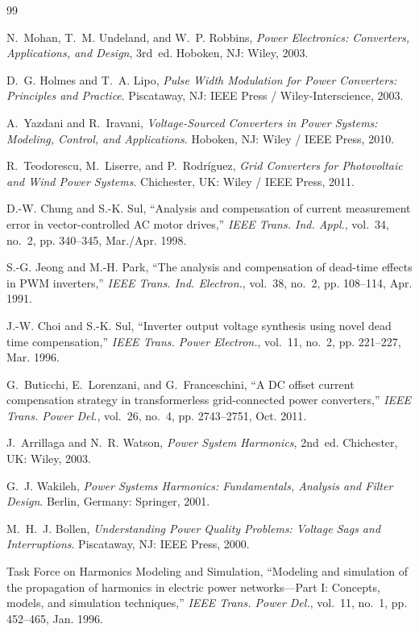 \documentclass[11pt,a4paper]{article}
\begin{document}
\begin{thebibliography}{99}

N.~Mohan, T.~M. Undeland, and W.~P. Robbins,
\emph{Power Electronics: Converters, Applications, and Design}, 3rd~ed.
Hoboken, NJ: Wiley, 2003.

D.~G. Holmes and T.~A. Lipo,
\emph{Pulse Width Modulation for Power Converters: Principles and Practice}.
Piscataway, NJ: IEEE Press / Wiley-Interscience, 2003.

A.~Yazdani and R.~Iravani,
\emph{Voltage-Sourced Converters in Power Systems: Modeling, Control, and
Applications}. Hoboken, NJ: Wiley / IEEE Press, 2010.

R.~Teodorescu, M.~Liserre, and P.~Rodr\'iguez,
\emph{Grid Converters for Photovoltaic and Wind Power Systems}.
Chichester, UK: Wiley / IEEE Press, 2011.

D.-W. Chung and S.-K. Sul,
``Analysis and compensation of current measurement error in vector-controlled
AC motor drives,'' \emph{IEEE Trans. Ind. Appl.}, vol.~34, no.~2,
pp. 340--345, Mar./Apr. 1998.

S.-G. Jeong and M.-H. Park,
``The analysis and compensation of dead-time effects in PWM inverters,''
\emph{IEEE Trans. Ind. Electron.}, vol.~38, no.~2, pp. 108--114, Apr. 1991.

J.-W. Choi and S.-K. Sul,
``Inverter output voltage synthesis using novel dead time compensation,''
\emph{IEEE Trans. Power Electron.}, vol.~11, no.~2, pp. 221--227, Mar. 1996.

G.~Buticchi, E.~Lorenzani, and G.~Franceschini,
``A DC offset current compensation strategy in transformerless grid-connected
power converters,'' \emph{IEEE Trans. Power Del.}, vol.~26, no.~4,
pp. 2743--2751, Oct. 2011.

J.~Arrillaga and N.~R. Watson,
\emph{Power System Harmonics}, 2nd~ed. Chichester, UK: Wiley, 2003.

G.~J. Wakileh,
\emph{Power Systems Harmonics: Fundamentals, Analysis and Filter Design}.
Berlin, Germany: Springer, 2001.

M.~H.~J. Bollen,
\emph{Understanding Power Quality Problems: Voltage Sags and Interruptions}.
Piscataway, NJ: IEEE Press, 2000.

Task Force on Harmonics Modeling and Simulation,
``Modeling and simulation of the propagation of harmonics in electric power
networks---Part I: Concepts, models, and simulation techniques,''
\emph{IEEE Trans. Power Del.}, vol.~11, no.~1, pp. 452--465, Jan. 1996.


\end{thebibliography}
\end{document}
